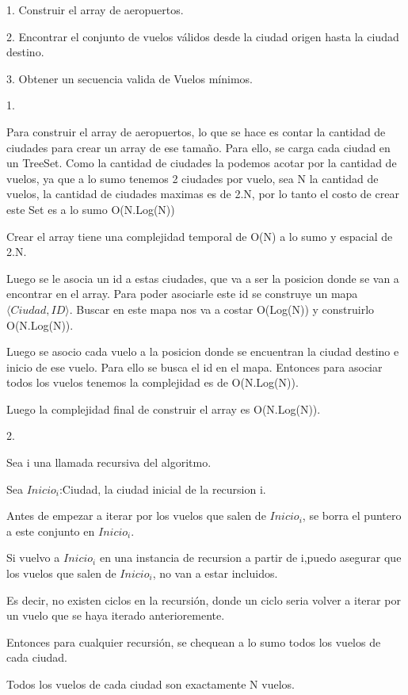 1. Construir el array de aeropuertos.

2. Encontrar el conjunto de vuelos v\'alidos desde la ciudad origen hasta la ciudad destino.

3. Obtener un secuencia valida de Vuelos m\'inimos.

1.

Para construir el array de aeropuertos, lo que se hace es contar la cantidad de ciudades para crear un array de ese tamaño.
Para ello, se carga cada ciudad en un TreeSet. Como la cantidad de ciudades la podemos acotar por la cantidad de vuelos, ya que a lo sumo tenemos 2 ciudades por vuelo, sea N la cantidad de vuelos, la cantidad de ciudades maximas es de 2.N, por lo tanto el costo de crear este Set es a lo sumo O(N.Log(N))

Crear el array tiene una complejidad temporal de O(N) a lo sumo y espacial de 2.N.

Luego se le asocia un id a estas ciudades, que va a ser la posicion donde se van a encontrar en el array. Para poder asociarle este id se construye un mapa $\langle Ciudad,ID \rangle$.
Buscar en este mapa nos va a costar O(Log(N)) y construirlo O(N.Log(N)).

Luego se asocio cada vuelo a la posicion donde se encuentran la ciudad destino e inicio de ese vuelo.
Para ello se busca el id en el mapa. Entonces para asociar todos los vuelos tenemos la complejidad es de O(N.Log(N)).

Luego la complejidad final de construir el array es O(N.Log(N)).

2.

Sea i una llamada recursiva del algoritmo.

Sea $Inicio_{i}$:Ciudad, la ciudad inicial de la recursion i.



Antes de empezar a iterar por los vuelos que salen de $Inicio_{i}$, se borra el puntero a este conjunto en $Inicio_{i}$.

Si vuelvo a $Inicio_{i}$ en una instancia de recursion a partir de i,puedo asegurar que los vuelos que salen de $Inicio_{i}$, no van a estar incluidos.

Es decir, no existen ciclos en la recursi\'on, donde un ciclo seria volver a iterar por un vuelo que se haya iterado anterioremente.

Entonces para cualquier recursi\'on, se chequean a lo sumo todos los vuelos de cada ciudad.

Todos los vuelos de cada ciudad son exactamente N vuelos.

